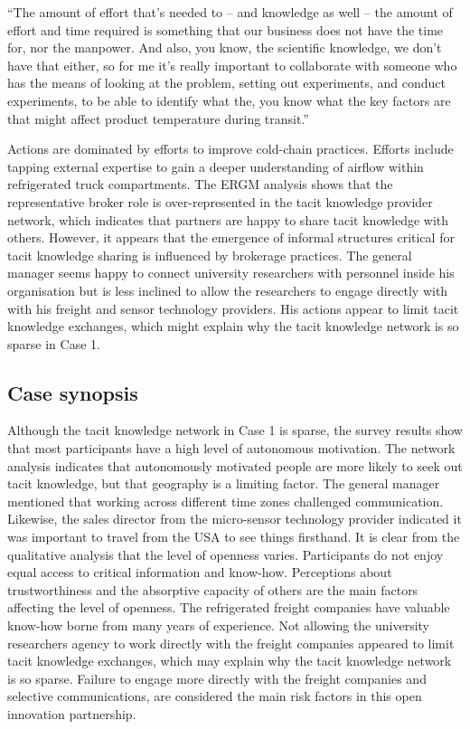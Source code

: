 \begin{displayquote}[Participant 1/1]
\small
\enquote{The amount of effort that's needed to – and knowledge as well – the amount of effort and time required is something that our business does not have the time for, nor the manpower. And also, you know, the scientific knowledge, we don't have that either, so for me it's really important to collaborate with someone who has the means of looking at the problem, setting out experiments, and conduct experiments, to be able to identify what the, you know what the key factors are that might affect product temperature during transit.} 
\end{displayquote}


Actions are dominated by efforts to improve cold-chain practices. Efforts include tapping external expertise to gain a deeper understanding of airflow within refrigerated truck compartments. The ERGM analysis shows that the representative broker role is over-represented in the tacit knowledge provider network, which indicates that partners are happy to share tacit knowledge with others. However, it appears that the emergence of informal structures critical for tacit knowledge sharing is influenced by brokerage practices. The general manager seems happy to connect university researchers with personnel inside his organisation but is less inclined to allow the researchers to engage directly with with his freight and sensor technology providers. His actions appear to limit tacit knowledge exchanges, which might explain why the tacit knowledge network is so sparse in Case 1.

\subsection{Case synopsis}

Although the tacit knowledge network in Case 1 is sparse, the survey results show that most participants have a high level of autonomous motivation. The network analysis indicates that autonomously motivated people are more likely to seek out tacit knowledge, but that geography is a limiting factor. The general manager mentioned that working across different time zones challenged communication. Likewise, the sales director from the micro-sensor technology provider indicated it was important to travel from the USA to see things firsthand. It is clear from the qualitative analysis that the level of openness varies. Participants do not enjoy equal access to critical information and know-how. Perceptions about trustworthiness and the absorptive capacity of others are the main factors affecting the level of openness. The refrigerated freight companies have valuable know-how borne from many years of experience. Not allowing the university researchers agency to work directly with the freight companies appeared to limit tacit knowledge exchanges, which may explain why the tacit knowledge network is so sparse. Failure to engage more directly with the freight companies and selective communications, are considered the main risk factors in this open innovation partnership.

